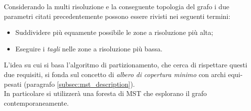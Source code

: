 Considerando la multi risoluzione e la conseguente topologia del grafo i due parametri citati precedentemente possono essere rivisti nei seguenti termini:
\begin{itemize}
	\item Suddividere più equamente possibile le zone a risoluzione più alta;
	\item Eseguire i \textit{tagli} nelle zone a risoluzione più bassa.
\end{itemize}

L'idea su cui si basa l'algoritmo di partizionamento, che cerca di rispettare questi due requisiti, si fonda sul concetto di \textit{albero di copertura minimo} con archi equi-pesati (paragrafo \ref{subsec:mst_description}).\\
In particolare si utilizzerà una foresta di MST che esplorano il grafo contemporaneamente.\\


